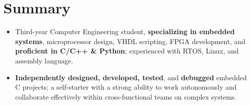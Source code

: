\documentclass[letterpaper,11pt]{article}
\newcommand{\resumeItem}[1]{
  \item\small{
    {#1 \vspace{-2pt}}
  }
}
\newcommand{\spaceReducer}{ %
    \vspace{-0.5cm}
}
\newcommand{\resumeItemListStart}{\begin{itemize}}
\newcommand{\resumeItemListEnd}{\end{itemize}\vspace{-5pt}}
\begin{document}





\section{Summary}
    \resumeItemListStart
        \resumeItem{Third-year Computer Engineering student, \textbf{specializing in embedded systems}, microprocessor design, VHDL scripting, FPGA development, and \textbf{proficient in C/C++ \& Python}; experienced with RTOS, Linux, and assembly language.}
        \resumeItem{\textbf{Independently designed, developed, tested}, and \textbf{debugged} embedded C projects; a self-starter with a strong ability to work autonomously and collaborate effectively within cross-functional teams on complex systems.}
    \resumeItemListEnd
    \spaceReducer

\end{document}
